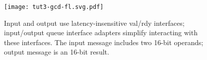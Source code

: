 
\begin{figure}
  \centering

  \begin{minipage}[t]{0.52\tw}
    \vspace{0pt}

    \texttt{[image: tut3-gcd-fl.svg.pdf]}
  \end{minipage}
  \hfill
  \begin{minipage}[t]{0.45\tw}

    \caption{ Input and output
      use latency-insensitive val/rdy interfaces; input/output queue
      interface adapters simplify interacting with these interfaces. The
      input message includes two 16-bit operands; output message is an
      16-bit result.}

    \label{fig-tut3-gcd-fl}

  \end{minipage}

\end{figure}

